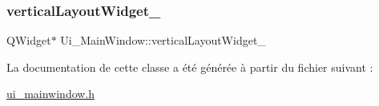 \subsubsection{\texorpdfstring{vertical\+Layout\+Widget\+\_}{verticalLayoutWidget\_3}}
{\footnotesize\ttfamily Q\+Widget$\ast$ Ui\+\_\+\+Main\+Window\+::vertical\+Layout\+Widget\+\_}



La documentation de cette classe a été générée à partir du fichier suivant \+:\begin{DoxyCompactItemize}
\item 
\hyperlink{ui__mainwindow_8h}{ui\+\_\+mainwindow.\+h}\end{DoxyCompactItemize}
